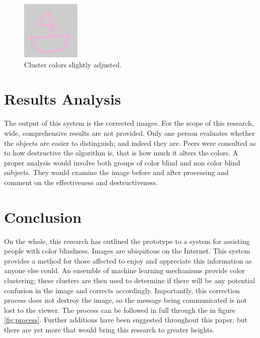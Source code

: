 \documentclass[12pt]{article}
\begin{document}
\begin{multicols}{2}
\begin{figure}[H]
	\centering
	\includegraphics[width=0.25\textwidth]{img/noise_data2_noise_corrected.png}
	\caption{Cluster colors slightly adjusted.}
	\label{fig:corrected1}
\end{figure}


\section{Results Analysis}


The output of this system is the corrected images. For the scope of this research, wide, comprehensive results are not provided. Only one person evaluates whether the objects are easier to distinguish; and indeed they are. Peers were consulted  as to how destructive the algorithm is, that is how much it alters the colors. A proper analysis would involve both groups of color blind and non color blind subjects. They would examine the image before and after processing and comment on the effectiveness and destructiveness. 

\section{Conclusion}
On the whole, this research has outlined the prototype to a system for assisting people with color blindness. Images are ubiquitous on the Internet. This system provides a method for those affected to enjoy and appreciate this information as anyone else could. An ensemble of machine learning mechanisms provide color clustering; these clusters are then used to determine if there will be any potential confusion in the image and corrects accordingly. Importantly, this correction process does not destroy the image, so the message being communicated is not lost to the viewer. The process can be followed in full through the in figure \ref{fig:process}. Further additions have been suggested throughout this paper, but there are yet more that would bring this research to greater heights.
\end{multicols}
\end{document}
